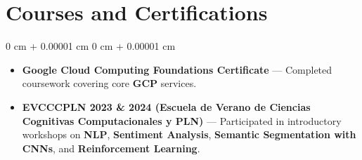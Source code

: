 \documentclass[10pt, letterpaper]{article}
\newenvironment{highlights}{
	\begin{itemize}[
		topsep=0.10 cm,
		parsep=0.10 cm,
		partopsep=0pt,
		itemsep=0pt,
		leftmargin=0 cm + 10pt
		]
	}{
	\end{itemize}
} %
\newenvironment{onecolentry}{
	\begin{adjustwidth}{
			0 cm + 0.00001 cm
		}{
			0 cm + 0.00001 cm
		}
	}{
	\end{adjustwidth}
} %
\begin{document}
	
	\section{Courses and Certifications}
	
	
\begin{onecolentry}
	\begin{highlights}
		\item \textbf{Google Cloud Computing Foundations Certificate} — Completed coursework covering core \textbf{GCP} services.
		\item \textbf{EVCCCPLN 2023 \& 2024 (Escuela de Verano de Ciencias Cognitivas Computacionales y PLN)} — Participated in introductory workshops on \textbf{NLP}, \textbf{Sentiment Analysis}, \textbf{Semantic Segmentation with CNNs}, and \textbf{Reinforcement Learning}.
	\end{highlights}
\end{onecolentry}

	
	
	
	
\end{document}
